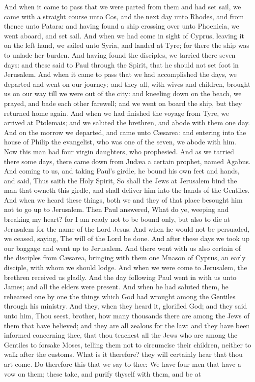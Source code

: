 And when it came to pass that we were parted from them and had set sail, we came with a straight course unto Cos, and the next day unto Rhodes, and from thence unto Patara: and having found a ship crossing over unto Phoenicia, we went aboard, and set sail. And when we had come in sight of Cyprus, leaving it on the left hand, we sailed unto Syria, and landed at Tyre; for there the ship was to unlade her burden. And having found the disciples, we tarried there seven days: and these said to Paul through the Spirit, that he should not set foot in Jerusalem. And when it came to pass that we had accomplished the days, we departed and went on our journey; and they all, with wives and children, brought us on our way till we were out of the city: and kneeling down on the beach, we prayed, and bade each other farewell; and we went on board the ship, but they returned home again.  And when we had finished the voyage from Tyre, we arrived at Ptolemais; and we saluted the brethren, and abode with them one day. And on the morrow we departed, and came unto Cæsarea: and entering into the house of Philip the evangelist, who was one of the seven, we abode with him. Now this man had four virgin daughters, who prophesied. And as we tarried there some days, there came down from Judæa a certain prophet, named Agabus. And coming to us, and taking Paul’s girdle, he bound his own feet and hands, and said, Thus saith the Holy Spirit, So shall the Jews at Jerusalem bind the man that owneth this girdle, and shall deliver him into the hands of the Gentiles. And when we heard these things, both we and they of that place besought him not to go up to Jerusalem. Then Paul answered, What do ye, weeping and breaking my heart? for I am ready not to be bound only, but also to die at Jerusalem for the name of the Lord Jesus. And when he would not be persuaded, we ceased, saying, The will of the Lord be done.  And after these days we took up our baggage and went up to Jerusalem. And there went with us also certain of the disciples from Cæsarea, bringing with them one Mnason of Cyprus, an early disciple, with whom we should lodge.  And when we were come to Jerusalem, the brethren received us gladly. And the day following Paul went in with us unto James; and all the elders were present. And when he had saluted them, he rehearsed one by one the things which God had wrought among the Gentiles through his ministry. And they, when they heard it, glorified God; and they said unto him, Thou seest, brother, how many thousands there are among the Jews of them that have believed; and they are all zealous for the law: and they have been informed concerning thee, that thou teachest all the Jews who are among the Gentiles to forsake Moses, telling them not to circumcise their children, neither to walk after the customs. What is it therefore? they will certainly hear that thou art come. Do therefore this that we say to thee: We have four men that have a vow on them; these take, and purify thyself with them, and be at 